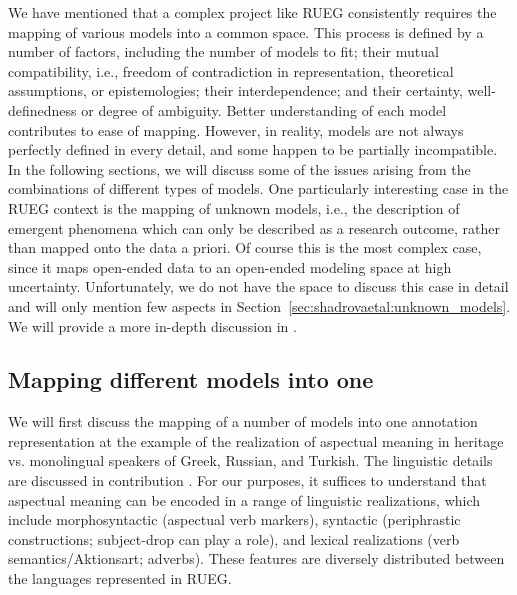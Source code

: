 \documentclass[output=paper,colorlinks,citecolor=brown]{langscibook}
\begin{document}
We have mentioned that a complex project like RUEG consistently requires the mapping of various models into a common space. This process is defined by a number of factors, including the number of models to fit; their mutual compatibility, i.e., freedom of contradiction in representation, theoretical assumptions, or epistemologies; their interdependence; and their certainty, well-definedness or degree of ambiguity. Better understanding of each model contributes to ease of mapping. However, in reality, models are not always perfectly defined in every detail, and some happen to be partially incompatible. In the following sections, we will discuss some of the issues arising from the combinations of different types of models. One particularly interesting case in the RUEG context is the mapping of unknown models, i.e., the description of emergent phenomena which can only be described as a research outcome, rather than mapped onto the data a priori. Of course this is the most complex case, since it maps open-ended data to an open-ended modeling space at high uncertainty. Unfortunately, we do not have the space to discuss this case in detail and will only mention few aspects in Section~\ref{sec:shadrovaetal:unknown_models}. We will provide a more in-depth discussion in \textcite{martinAnnaInPrep2}.

\subsection{Mapping different models into one}
\label{sec:shadrovaetal:different_models}

We will first discuss the mapping of a number of models into one annotation representation at the example of the realization of aspectual meaning in heritage vs. monolingual speakers of Greek, Russian, and Turkish. The linguistic details are discussed in contribution . For our purposes, it suffices to understand that aspectual meaning can be encoded in a range of linguistic realizations, which include morphosyntactic (aspectual verb markers), syntactic (periphrastic constructions; subject-drop can play a role), and lexical realizations (verb semantics\slash Aktionsart; adverbs). These features are diversely distributed between the languages represented in RUEG. 
\end{document}
